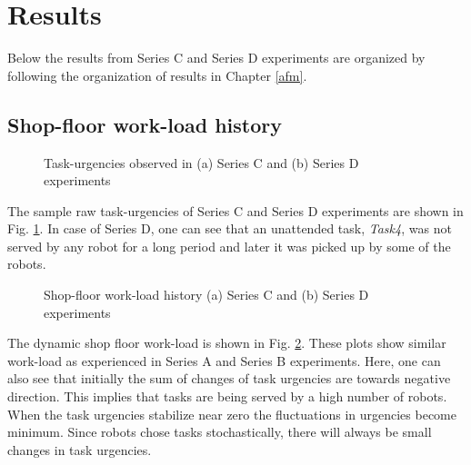 \section{Results}
\label{sec:results}
Below the results from Series C and Series D experiments are organized by following the organization of results in Chapter \ref{afm}.
\subsection*{Shop-floor work-load history}
\begin{figure}[H]
\centering
\hspace*{0.5cm}
\newline
{}
\caption{\small Task-urgencies observed in (a) Series C and (b) Series D experiments}
\label{fig:raw-urgencies-SC-SD} 
\end{figure}

The sample raw task-urgencies of Series C and Series D experiments are shown in Fig. \ref{fig:raw-urgencies-SC-SD}. In case of Series D, one can see that an unattended task, \textit{Task4}, was not served by any robot for a long period and later it was picked up by some of the robots. 

\begin{figure}[H]
\centering
\hspace*{0.5cm}
\newline
{}
\caption{\small Shop-floor work-load history (a) Series C and (b) Series D experiments}
\label{fig:workload-SC-SD} 
\end{figure}
The dynamic shop floor work-load is shown in Fig. \ref{fig:workload-SC-SD}. These plots show similar work-load as experienced in Series A and Series B experiments. Here, one can also see that initially the sum of changes of task urgencies are towards negative direction. This implies that tasks are being served by a high number of robots. When the task urgencies stabilize near zero the fluctuations in urgencies become minimum. Since robots chose tasks stochastically, there will always be  small changes in task urgencies.
%

